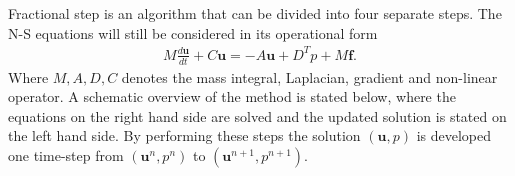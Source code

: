 Fractional step is an algorithm that can be divided into four separate steps. The N-S equations will still 
be considered in its operational form 
\begin{align}
    M\frac{d \mathbf{u}}{dt} + C\mathbf{u} = -A\mathbf{u} +D^T p +M\mathbf{f}.
    \label{eq:NSfracstep}
\end{align}
%
Where $M,A,D,C$ denotes the mass integral, Laplacian, gradient and non-linear operator. 
A schematic overview of the method is stated below, where the equations on the right hand side are 
solved and the updated solution is stated on the left hand side. By performing these 
steps the solution $(\mathbf{u},p)$ is developed one time-step
from $(\mathbf{u}^n,p^n)$ to $(\mathbf{u}^{n+1},p^{n+1})$. 
